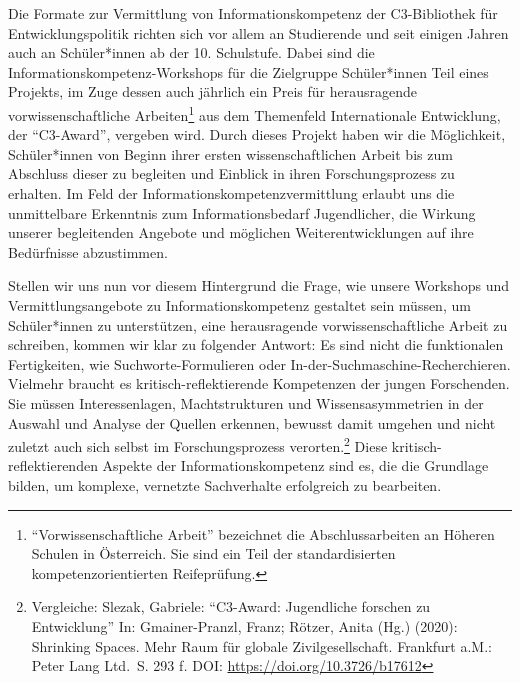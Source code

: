 \documentclass[a4paper,
fontsize=11pt,
oneside,
numbers=noperiodatend,
parskip=half-,
bibliography=totoc,
final
]{scrartcl}
\begin{document}
Die Formate zur Vermittlung von Informationskompetenz der C3-Bibliothek
für Entwicklungspolitik richten sich vor allem an Studierende und seit
einigen Jahren auch an Schüler*innen ab der 10. Schulstufe. Dabei sind
die Informationskompetenz-Workshops für die Zielgruppe Schüler*innen
Teil eines Projekts, im Zuge dessen auch jährlich ein Preis für
herausragende vorwissenschaftliche Arbeiten\footnote{\enquote{Vorwissenschaftliche
  Arbeit} bezeichnet die Abschlussarbeiten an Höheren Schulen in
  Österreich. Sie sind ein Teil der standardisierten
  kompetenzorientierten Reifeprüfung.} aus dem Themenfeld Internationale
Entwicklung, der \enquote{C3-Award}, vergeben wird. Durch dieses Projekt
haben wir die Möglichkeit, Schüler*innen von Beginn ihrer ersten
wissenschaftlichen Arbeit bis zum Abschluss dieser zu begleiten und
Einblick in ihren Forschungsprozess zu erhalten. Im Feld der
Informationskompetenzvermittlung erlaubt uns die unmittelbare Erkenntnis
zum Informationsbedarf Jugendlicher, die Wirkung unserer begleitenden
Angebote und möglichen Weiterentwicklungen auf ihre Bedürfnisse
abzustimmen.

Stellen wir uns nun vor diesem Hintergrund die Frage, wie unsere
Workshops und Vermittlungsangebote zu Informationskompetenz gestaltet
sein müssen, um Schüler*innen zu unterstützen, eine herausragende
vorwissenschaftliche Arbeit zu schreiben, kommen wir klar zu folgender
Antwort: Es sind nicht die funktionalen Fertigkeiten, wie
Suchworte-Formulieren oder In-der-Suchmaschine-Recherchieren. Vielmehr
braucht es kritisch-reflektierende Kompetenzen der jungen Forschenden.
Sie müssen Interessenlagen, Machtstrukturen und Wissensasymmetrien in
der Auswahl und Analyse der Quellen erkennen, bewusst damit umgehen und
nicht zuletzt auch sich selbst im Forschungsprozess verorten.\footnote{Vergleiche:
  Slezak, Gabriele: \enquote{C3-Award: Jugendliche forschen zu
  Entwicklung} In: Gmainer-Pranzl, Franz; Rötzer, Anita (Hg.) (2020):
  Shrinking Spaces. Mehr Raum für globale Zivilgesellschaft. Frankfurt
  a.M.: Peter Lang Ltd.~S. 293 f\emph{.} DOI:
  \url{https://doi.org/10.3726/b17612}} Diese kritisch-reflektierenden
Aspekte der Informationskompetenz sind es, die die Grundlage bilden, um
komplexe, vernetzte Sachverhalte erfolgreich zu bearbeiten.
\end{document}
